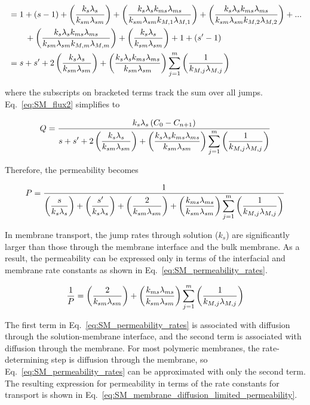 \begin{align*}
    &= 1 + \left( s-1 \right) + \parfrac{k_s \lami{s}}{k_{sm} \lami{sm}} + \parfrac{k_s \lami{s} k_{ms} \lami{ms}}{k_{sm} \lami{sm} k_{M,1} \lami{M,1}} + \parfrac{k_s \lami{s} k_{ms} \lami{ms}}{k_{sm} \lami{sm} k_{M,2} \lami{M,2}} + ... \\
    & \hspace{20px} + \parfrac{k_s \lami{s} k_{ms} \lami{ms}}{k_{sm} \lami{sm} k_{M,m} \lami{M,m}} + \parfrac{k_s \lami{s}}{k_{sm} \lami{sm}} + 1 + \left( s'-1 \right) \\
    &= s + s' + 2 \parfrac{k_s \lami{s}}{k_{sm} \lami{sm}} + \parfrac{k_s \lami{s} k_{ms} \lami{ms}}{k_{sm} \lami{sm}} \sum_{j=1}^m \parfrac{1}{k_{M,j} \lami{M,j}}
\end{align*}

\noindent where the subscripts on bracketed terms track the sum over all jumps. Eq.~\ref{eq:SM_flux2} simplifies to

\begin{equation}
    Q = \frac{k_s \lambda_{s} \left( C_0 - C_{n+1} \right)}{\displaystyle s + s' + 2 \left( \frac{k_s \lambda_{s}}{k_{sm} \lambda_{sm}} \right) + \left( \frac{k_s \lambda_{s} k_{ms} \lambda_{ms}}{k_{sm} \lambda_{sm}} \right) \sum_{j=1}^m \left( \frac{1}{k_{M,j} \lambda_{M,j}} \right)}
    \label{eq:SM_flux_final}
\end{equation}

\noindent Therefore, the permeability becomes

\begin{equation}
    P = \frac{1}{\displaystyle \left( \frac{s}{k_s \lambda_{s}} \right) + \left( \frac{s'}{k_s \lambda_{s}} \right) + \left( \frac{2}{k_{sm} \lambda_{sm}} \right) + \left( \frac{k_{ms} \lambda_{ms}}{k_{sm} \lambda_{sm}} \right) \sum_{j=1}^m \left( \frac{1}{k_{M,j} \lambda_{M,j}} \right)}
\end{equation}

\noindent In membrane transport, the jump rates through solution ($k_s$) are significantly larger than those through the membrane interface and the bulk membrane. As a result, the permeability can be expressed only in terms of the interfacial and membrane rate constants as shown in Eq.~\ref{eq:SM_permeability_rates}.

\begin{equation}
    \frac{1}{P} = \left( \frac{2}{k_{sm} \lambda_{sm}} \right) + \left( \frac{k_{ms} \lambda_{ms}}{k_{sm} \lambda_{sm}} \right) \sum_{j=1}^m \left( \frac{1}{k_{M,j} \lambda_{M,j}} \right)
    \label{eq:SM_permeability_rates}
\end{equation}

\noindent The first term in Eq.~\ref{eq:SM_permeability_rates} is associated with diffusion through the solution-membrane interface, and the second term is associated with diffusion through the membrane. For most polymeric membranes, the rate-determining step is diffusion through the membrane, so Eq.~\ref{eq:SM_permeability_rates} can be approximated with only the second term. The resulting expression for permeability in terms of the rate constants for transport is shown in Eq.~\ref{eq:SM_membrane_diffusion_limited_permeability}.

